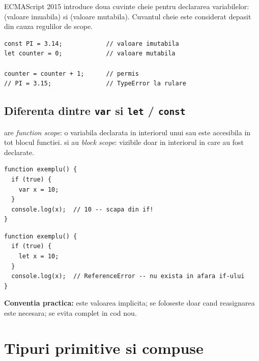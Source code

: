 ECMAScript 2015 introduce doua cuvinte cheie pentru declararea variabilelor:  (valoare imuabila) si  (valoare mutabila). Cuvantul cheie  este considerat depasit din cauza regulilor de scope.

\begin{lstlisting}[style=js, caption={Reguli de declarare}]
const PI = 3.14;            // valoare imutabila
let counter = 0;            // valoare mutabila

counter = counter + 1;      // permis
// PI = 3.15;               // TypeError la rulare
\end{lstlisting}

\subsection{Diferenta dintre \texttt{var} si \texttt{let} / \texttt{const}}

 are \emph{function scope}: o variabila declarata in interiorul unui  sau  este accesibila in tot blocul functiei.  si  au \emph{block scope}: vizibile doar in interiorul  in care au fost declarate.

\begin{dano}
\begin{lstlisting}[style=js, numbers=none]
function exemplu() {
  if (true) {
    var x = 10;
  }
  console.log(x);  // 10 -- scapa din if!
}
\end{lstlisting}
\end{dano}

\begin{dado}
\begin{lstlisting}[style=js, numbers=none]
function exemplu() {
  if (true) {
    let x = 10;
  }
  console.log(x);  // ReferenceError -- nu exista in afara if-ului
}
\end{lstlisting}
\end{dado}

\textbf{Conventia practica:}  este valoarea implicita;  se foloseste doar cand reasignarea este necesara;  se evita complet in cod nou.

\section{Tipuri primitive si compuse}

